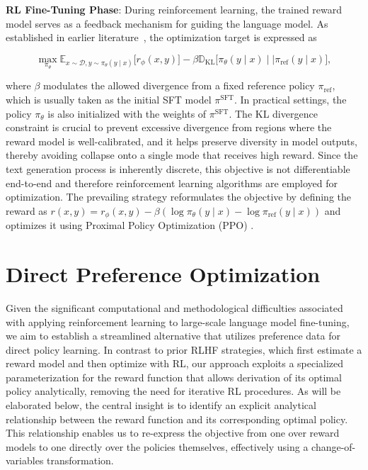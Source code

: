 \textbf{RL Fine-Tuning Phase}: During reinforcement learning, the trained reward model serves as a feedback mechanism for guiding the language model. As established in earlier literature~\citep{jaques2017sequence, jaques2020human}, the optimization target is expressed as

\begin{equation}\label{eq:RL}
\max_{\pi_{\theta}}  \mathbb{E}_{x\sim \mathcal{D}, y\sim \pi_{\theta}(y \mid x)}\bigl[r_{\phi}(x, y)\bigr] - \beta\mathbb{D}_{\textrm{KL}}\bigl[\pi_{\theta}(y\mid x)\mid \mid \pi_\text{ref}(y\mid x)\bigr],
\end{equation}

where $\beta$ modulates the allowed divergence from a fixed reference policy $\pi_\text{ref}$, which is usually taken as the initial SFT model $\pi^\text{SFT}$. In practical settings, the policy $\pi_\theta$ is also initialized with the weights of $\pi^\text{SFT}$. The KL divergence constraint is crucial to prevent excessive divergence from regions where the reward model is well-calibrated, and it helps preserve diversity in model outputs, thereby avoiding collapse onto a single mode that receives high reward. Since the text generation process is inherently discrete, this objective is not differentiable end-to-end and therefore reinforcement learning algorithms are employed for optimization. The prevailing strategy \citep{ziegler2020finetuning, stiennon2022learning, bai2022training, ouyang2022training} reformulates the objective by defining the reward as ${r(x, y) = r_{\phi}(x, y) -\beta (\log \pi_{\theta}(y\mid x) - \log \pi_\text{ref}(y\mid x))}$ and optimizes it using Proximal Policy Optimization (PPO) \cite{schulman2017proximal}.

\section{Direct Preference Optimization}\label{sec:DPO}

Given the significant computational and methodological difficulties associated with applying reinforcement learning to large-scale language model fine-tuning, we aim to establish a streamlined alternative that utilizes preference data for direct policy learning. In contrast to prior RLHF strategies, which first estimate a reward model and then optimize with RL, our approach exploits a specialized parameterization for the reward function that allows derivation of its optimal policy analytically, removing the need for iterative RL procedures. As will be elaborated below, the central insight is to identify an explicit analytical relationship between the reward function and its corresponding optimal policy. This relationship enables us to re-express the objective from one over reward models to one directly over the policies themselves, effectively using a change-of-variables transformation.

